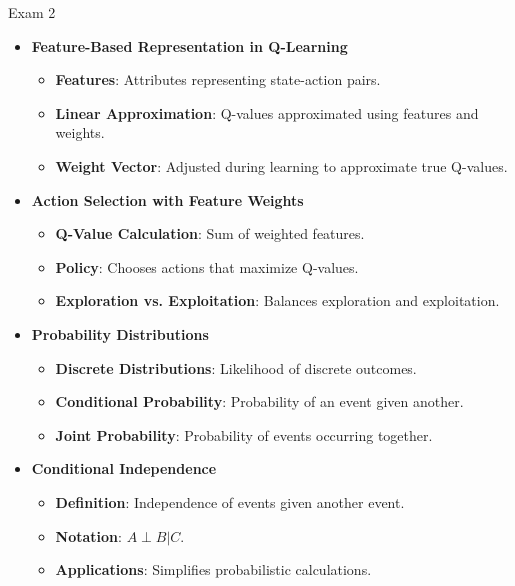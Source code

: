 \begin{examnotes}{Exam 2}
\begin{highlight}
        \begin{itemize}
            \item \textbf{Feature-Based Representation in Q-Learning}
                \begin{itemize}
                    \item \textbf{Features}: Attributes representing state-action pairs.
                    \item \textbf{Linear Approximation}: Q-values approximated using features and weights.
                    \item \textbf{Weight Vector}: Adjusted during learning to approximate true Q-values.
                \end{itemize}
            \item \textbf{Action Selection with Feature Weights}
                \begin{itemize}
                    \item \textbf{Q-Value Calculation}: Sum of weighted features.
                    \item \textbf{Policy}: Chooses actions that maximize Q-values.
                    \item \textbf{Exploration vs. Exploitation}: Balances exploration and exploitation.
                \end{itemize}
            \item \textbf{Probability Distributions}
                \begin{itemize}
                    \item \textbf{Discrete Distributions}: Likelihood of discrete outcomes.
                    \item \textbf{Conditional Probability}: Probability of an event given another.
                    \item \textbf{Joint Probability}: Probability of events occurring together.
                \end{itemize}
            \item \textbf{Conditional Independence}
                \begin{itemize}
                    \item \textbf{Definition}: Independence of events given another event.
                    \item \textbf{Notation}: $A \perp B | C$.
                    \item \textbf{Applications}: Simplifies probabilistic calculations.
                \end{itemize}
        \end{itemize}
    \end{highlight}


\end{examnotes}
